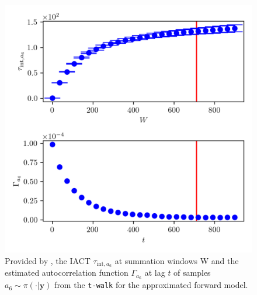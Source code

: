 \begin{figure}[ht!]
	\centering
	\includegraphics{UwerrTauIntTWalk17.png}
	\caption[IACT and autocorrelation function of samples $a_6 \sim \pi(\cdot|\bm{y})$, for approximated model.]{Provided by \cite{drikHesse}, the IACT $\tau_{\text{int},a_6}$ at summation windows W and the estimated autocorrelation function $\Gamma_{a_6}$ at lag $t$ of samples $a_6 \sim \pi( \cdot| \bm{y})$ from the \texttt{t-walk} for the approximated forward model.}
	\label{fig:TWalkIATC18}
\end{figure}





